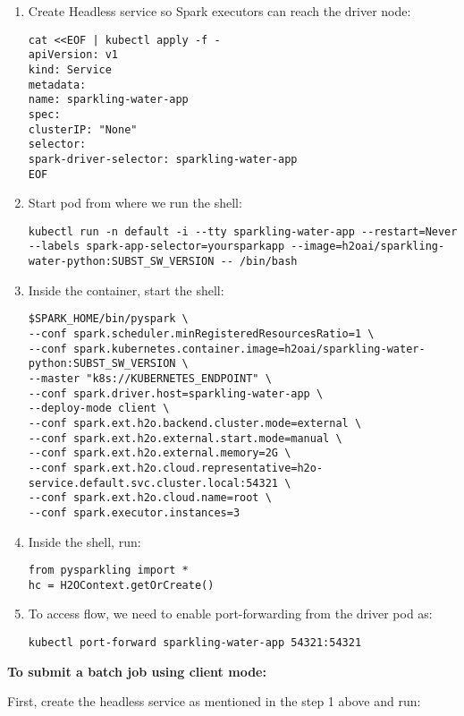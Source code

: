 \begin{enumerate}
    \item Create Headless service so Spark executors can reach the driver node:
    \begin{lstlisting}[style=Bash]
cat <<EOF | kubectl apply -f -
apiVersion: v1
kind: Service
metadata:
name: sparkling-water-app
spec:
clusterIP: "None"
selector:
spark-driver-selector: sparkling-water-app
EOF
    \end{lstlisting}
    \item Start pod from where we run the shell:
    \begin{lstlisting}[style=Bash]
kubectl run -n default -i --tty sparkling-water-app --restart=Never --labels spark-app-selector=yoursparkapp --image=h2oai/sparkling-water-python:SUBST_SW_VERSION -- /bin/bash
    \end{lstlisting}
    \item Inside the container, start the shell:
    \begin{lstlisting}[style=Bash]
$SPARK_HOME/bin/pyspark \
--conf spark.scheduler.minRegisteredResourcesRatio=1 \
--conf spark.kubernetes.container.image=h2oai/sparkling-water-python:SUBST_SW_VERSION \
--master "k8s://KUBERNETES_ENDPOINT" \
--conf spark.driver.host=sparkling-water-app \
--deploy-mode client \
--conf spark.ext.h2o.backend.cluster.mode=external \
--conf spark.ext.h2o.external.start.mode=manual \
--conf spark.ext.h2o.external.memory=2G \
--conf spark.ext.h2o.cloud.representative=h2o-service.default.svc.cluster.local:54321 \
--conf spark.ext.h2o.cloud.name=root \
--conf spark.executor.instances=3
    \end{lstlisting}
    \item Inside the shell, run:
    \begin{lstlisting}[style=Python]
from pysparkling import *
hc = H2OContext.getOrCreate()
    \end{lstlisting}
    \item To access flow, we need to enable port-forwarding from the driver pod as:
    \begin{lstlisting}[style=Bash]
kubectl port-forward sparkling-water-app 54321:54321
    \end{lstlisting}
\end{enumerate}


\textbf{To submit a batch job using client mode:}

First, create the headless service as mentioned in the step 1 above and run:

